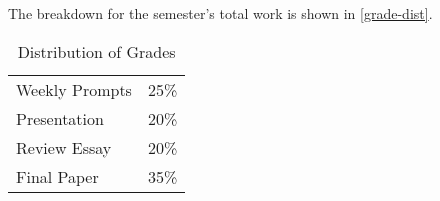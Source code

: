 \documentclass[titlepage]{article}
\newcommand\policy{../policy}
\begin{document}
The breakdown for the semester's total work is shown in
\autoref{grade-dist}.

\begin{table}[htbp]
  \centering
  {\lining
  \begin{tabular}{lr}
    \toprule
    Weekly Prompts & 25\% \\
    Presentation   & 20\% \\
    Review Essay   & 20\% \\
    Final Paper    & 35\% \\
    \bottomrule
  \end{tabular}}
  \caption{Distribution of Grades}
  \label{grade-dist}
\end{table}



\end{document}
